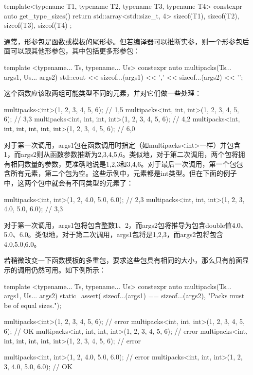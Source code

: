 \begin{cpp}
template<typename T1, typename T2,
         typename T3, typename T4>
constexpr auto get_type_sizes()
{
	return std::array<std::size_t, 4> {
		sizeof(T1), sizeof(T2), sizeof(T3), sizeof(T4)
	};
}
\end{cpp}

通常，形参包是函数或模板的尾形参。但若编译器可以推断实参，则一个形参包后面可以跟其他形参包，其中包括更多形参包：

\begin{cpp}
template <typename... Ts, typename... Us>
constexpr auto multipacks(Ts... args1, Us... args2)
{
	std::cout << sizeof...(args1) << ','
	          << sizeof...(args2) << '\n';
}
\end{cpp}

这个函数应该取两组可能类型不同的元素，并对它们做一些处理：

\begin{cpp}
multipacks<int>(1, 2, 3, 4, 5, 6);
                // 1,5
multipacks<int, int, int>(1, 2, 3, 4, 5, 6);
                // 3,3
multipacks<int, int, int, int>(1, 2, 3, 4, 5, 6);
                // 4,2
multipacks<int, int, int, int, int, int>(1, 2, 3, 4, 5, 6);
                // 6,0
\end{cpp}

对于第一次调用，args1包在函数调用时指定（如multipacks<int>一样）并包含1，而args2则从函数参数推断为2,3,4,5,6。类似地，对于第二次调用，两个包将拥有相同数量的参数，更准确地说是1,2,3和3,4,6。对于最后一次调用，第一个包包含所有元素，第二个包为空。这些示例中，元素都是int类型。但在下面的例子中，这两个包中就会有不同类型的元素了：

\begin{cpp}
multipacks<int, int>(1, 2, 4.0, 5.0, 6.0); // 2,3
multipacks<int, int, int>(1, 2, 3, 4.0, 5.0, 6.0); // 3,3
\end{cpp}

对于第一次调用，args1包将包含整数1、2，而args2包将推导为包含double值4.0、5.0、6.0。类似地，对于第二次调用，args1包将是1,2,3，而args2包将包含4.0,5.0,6.0。

若稍微改变一下函数模板的多重包，要求这些包具有相同的大小，那么只有前面显示的调用仍然可用。如下例所示：

\begin{cpp}
template <typename... Ts, typename... Us>
constexpr auto multipacks(Ts... args1, Us... args2)
{
	static_assert(
	sizeof...(args1) == sizeof...(args2),
	"Packs must be of equal sizes.");
}

multipacks<int>(1, 2, 3, 4, 5, 6); // error
multipacks<int, int, int>(1, 2, 3, 4, 5, 6); // OK
multipacks<int, int, int, int>(1, 2, 3, 4, 5, 6); // error
multipacks<int, int, int, int, int, int>(1, 2, 3, 4, 5, 6); // error

multipacks<int, int>(1, 2, 4.0, 5.0, 6.0); // error
multipacks<int, int, int>(1, 2, 3, 4.0, 5.0, 6.0); // OK
\end{cpp}

